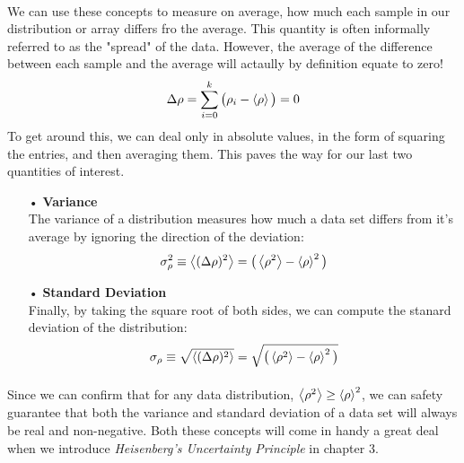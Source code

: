 \documentclass[12pt,letterpaper]{book}
\begin{document}
\paragraph*{}We can use these concepts to measure on average, how much each sample in our distribution or array differs fro the average. This quantity is often informally referred to as the "spread" of the data. However, the average of the difference between each sample and the average will actaully by definition equate to zero!
\begin{equation}
\label{spread}
\Delta \rho = \sum_{i=0}^{k} \big( \rho_i - \expval{\rho} \big) = 0
\end{equation}
To get around this, we can deal only in absolute values, in the form of squaring the entries, and then averaging them. This paves the way for our last two quantities of interest.

\begin{enumerate}
\item[•]\textbf{Variance}\\
The variance of a distribution measures how much a data set differs from it's average by ignoring the direction of the deviation:
\begin{equation}
\label{variance}
\sigma_{\rho}^2 \equiv \expval{(\Delta \rho)^2} = \big( \expval{\rho^2} - \expval{\rho}^2 \big)
\end{equation}
\item[•]\textbf{Standard Deviation}\\
Finally, by taking the square root of both sides, we can compute the stanard deviation of the distribution:
\begin{equation}
\label{std dev}
\sigma_{\rho} \equiv \sqrt{\expval{(\Delta \rho)^2}} = \sqrt{\big( \expval{\rho^2} - \expval{\rho}^2 \big)}
\end{equation}
\end{enumerate}
\paragraph*{}Since we can confirm that for any data distribution, $\expval{\rho^2} \geq \expval{\rho}^2$, we can safety guarantee that both the variance and standard deviation of a data set will always be real and non-negative. Both these concepts will come in handy a great deal when we introduce \textit{Heisenberg's Uncertainty Principle} in chapter 3.

\end{document}
